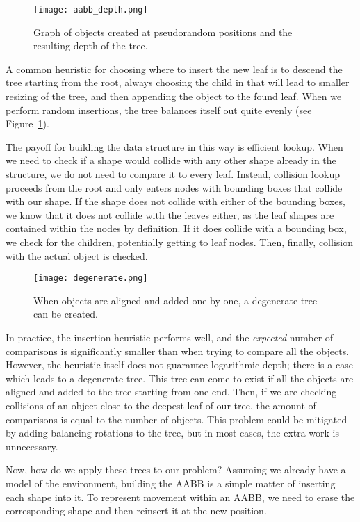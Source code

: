 \begin{figure}
  \centering
  \texttt{[image: aabb\_depth.png]}
  \caption{Graph of objects created at pseudorandom positions and the resulting depth of the tree.}\label{fig:aabb_depth}
\end{figure}

A common heuristic for choosing where to insert the new leaf is to descend the tree starting from the root, always choosing the child in that will lead to smaller resizing of the tree, and then appending the object to the found leaf. When we perform random insertions, the tree balances itself out quite evenly (see Figure~\ref{fig:aabb_depth}).

The payoff for building the data structure in this way is efficient lookup. When we need to check if a shape would collide with any other shape already in the structure, we do not need to compare it to every leaf. Instead, collision lookup proceeds from the root and only enters nodes with bounding boxes that collide with our shape. If the shape does not collide with either of the bounding boxes, we know that it does not collide with the leaves either, as the leaf shapes are contained within the nodes by definition. If it does collide with a bounding box, we check for the children, potentially getting to leaf nodes. Then, finally, collision with the actual object is checked.

\begin{wrapfigure}{r}{0.32\textwidth}
  \centering
  \texttt{[image: degenerate.png]}
  \caption{When objects are aligned and added one by one, a degenerate tree can be created.}
\end{wrapfigure}

In practice, the insertion heuristic performs well, and the \textit{expected} number of comparisons is significantly smaller than when trying to compare all the objects. However, the heuristic itself does not guarantee logarithmic depth; there is a case which leads to a degenerate tree. This tree can come to exist if all the objects are aligned and added to the tree starting from one end. Then, if we are checking collisions of an object close to the deepest leaf of our tree, the amount of comparisons is equal to the number of objects. This problem could be mitigated by adding balancing rotations to the tree, but in most cases, the extra work is unnecessary.

Now, how do we apply these trees to our problem? Assuming we already have a model of the environment, building the AABB is a simple matter of inserting each shape into it. To represent movement within an AABB, we need to erase the corresponding shape and then reinsert it at the new position.

